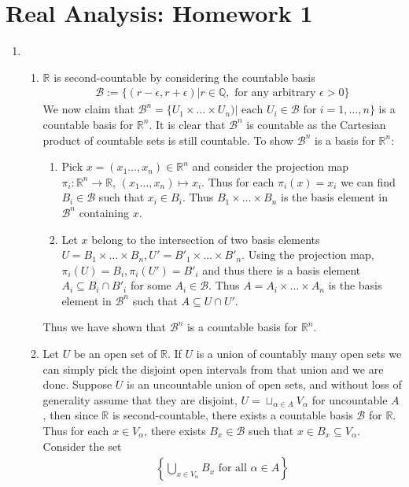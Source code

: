 \documentclass[a4paper,12pt]{article}
\theoremstyle{definition}
\begin{document}
\section*{Real Analysis: Homework 1}

\begin{enumerate}

\item
\begin{enumerate}
\item $\mathbb{R}$ is second-countable by considering the countable basis 
\begin{align*}
\mathcal{B}:=\{(r-\epsilon,r+\epsilon)| r \in \mathbb{Q}, \text{ for any arbitrary }\epsilon >0\}
\end{align*}
We now claim that $\mathcal{B}^n = \{U_1\times \ldots\times U_n)|\text{ each }U_i\in \mathcal{B}\text{ for }i=1,\ldots, n\}$ is a countable basis for $\mathbb{R}^n$. It is clear that $\mathcal{B}^n$ is countable as the Cartesian product of countable sets is still countable. To show $\mathcal{B}^n$ is a basis for $\mathbb{R}^n$:
\begin{enumerate}[(1)]
\item Pick $x = (x_1\ldots, x_n) \in \mathbb{R}^n$ and consider the projection map $\pi_i: \mathbb{R}^n \to \mathbb{R}$, $(x_1\ldots, x_n) \mapsto x_i$. Thus for each $\pi_i(x) = x_i$ we can find $B_i \in \mathcal{B}$ such that $x_i \in B_i$. Thus $B_1 \times \ldots \times B_n$ is the basis element in $\mathcal{B}^n$ containing $x$.
\item Let $x$ belong to the intersection of two basis elements $U = B_1 \times \ldots \times B_n, U' = B'_1 \times \ldots \times B'_n$. Using the projection map, $\pi_i(U) = B_i, \pi_i(U') = B'_i$ and thus there is a basis element $A_i \subseteq B_i \cap B'_i$ for some $A_i \in \mathcal{B}$. Thus $A = A_i \times \ldots \times A_n$ is the basis element in $\mathcal{B}^n$ such that $A \subseteq U \cap U'$.
\end{enumerate}
Thus we have shown that $\mathcal{B}^n$ is a countable basis for $\mathbb{R}^n$.



\item Let $U$ be an open set of $\mathbb{R}$. If $U$ is a union of countably many open sets we can simply pick the disjoint open intervals from that union and we are done. Suppose $U$ is an uncountable union of open sets, and without loss of generality assume that they are disjoint, $U = \sqcup_{\alpha \in A}V_\alpha$ for uncountable $A$, then since $\mathbb{R}$ is second-countable, there exists a countable basis $\mathcal{B}$ for $\mathbb{R}$. Thus for each $x \in V_\alpha$, there exists $B_x \in \mathcal{B}$ such that $x \in B_x \subseteq V_\alpha$. Consider the set 
\begin{align*}
\left\{\bigcup_{x\in V_\alpha} B_x \text{ for all }\alpha \in A\right\}
\end{align*}



\end{enumerate}
\end{enumerate}
\end{document}
